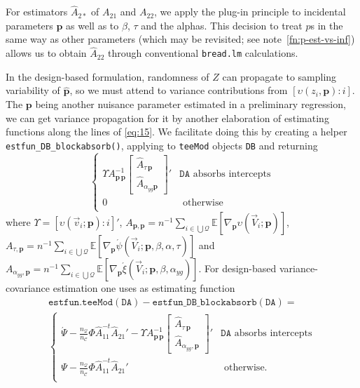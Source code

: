 \documentclass{article}
\newcommand{\absorbInterceptsEF}{\upsilon}
\newcommand{\AbsorbInterceptsEF}{\Upsilon}
\begin{document}
For estimators $\hat{A}_{2*}$ of $A_{21}$ and $A_{22}$, we apply the plug-in
principle to incidental parameters $\mathbf{p}$ as well as to $\beta$,
$\tau$ and the alphas. This decision to treat $p$s in the same way as
other parameters (which may be revisited; see note~\ref{fn:p-est-vs-inf}) allows
us to obtain $\hat{A}_{22}$ through conventional \texttt{bread.lm}
calculations. 

In the design-based formulation, randomness of $Z$ can propagate to
sampling variability of $\hat{\mathbf{p}}$,  so we must attend to
variance contributions from $[\absorbInterceptsEF(z_{i}, \mathbf{p}): i]$.
The $\mathbf{p}$ being another nuisance parameter estimated in a
preliminary regression, we can get variance propagation for it by
another elaboration of estimating functions along the lines of
\eqref{eq:15}. We facilitate doing
this by creating a
helper \texttt{estfun\_DB\_blockabsorb()}, applying to
\texttt{teeMod} objects \texttt{DB} and returning
\begin{equation*}
\begin{cases}
  \AbsorbInterceptsEF{}
  A_{\mathbf{p}\,\mathbf{p}}^{-1}
  \begin{bmatrix}\hat{A}_{\tau\,\mathbf{p}}\\ \hat{A}_{\alpha_{yg}\mathbf{p}}\end{bmatrix}' &
  \mathtt{DA} \text{ absorbs intercepts}\\
0 & \text{ otherwise}\\
\end{cases}
\end{equation*}
where
$\AbsorbInterceptsEF= [\absorbInterceptsEF(\vec{v}_{i}; \mathbf{p}): i]'$,
$A_{\mathbf{p}, \mathbf{p}} = n^{-1}\sum_{i\in \bigcup
  \mathcal{Q}}\mathbb{E} [\nabla_{\mathbf{p}}\absorbInterceptsEF(\vec{V}_{i};
\mathbf{p})]$, $A_{\tau, \mathbf{p}} = n^{-1} \sum_{i\in \bigcup
  \mathcal{Q}}\mathbb{E}[\nabla_{\mathbf{p}}\acute{\psi}(\vec{V}_{i};
\mathbf{p}, \beta, \alpha, \tau)]$ and
$A_{\alpha_{yg}, \mathbf{p}} = n^{-1} \sum_{i\in \bigcup
  \mathcal{Q}}\mathbb{E}[\nabla_{\mathbf{p}}\acute{\xi}(\vec{V}_{i};
\mathbf{p}, \beta, \alpha_{yg})]$.  For design-based variance-covariance
estimation one uses as estimating function
\begin{multline*}\label{eq:25}
  \mathtt{estfun.teeMod(DA)} -
  \mathtt{estfun\_DB\_blockabsorb(DA)} =\\
\begin{cases}
\acute{\Psi} -
  \frac{n_{\mathcal{Q}}}{n_{\mathcal{C}}}\Phi
  \hat{A}_{11}^{-t}\hat{A}_{21}'  - \AbsorbInterceptsEF{}
  A_{\mathbf{p}\,\mathbf{p}}^{-1}\begin{bmatrix}\hat{A}_{\tau\,\mathbf{p}}\\ \hat{A}_{\alpha_{yg}, \mathbf{p}}\end{bmatrix}' & \mathtt{DA} \text{ absorbs intercepts}\\
 \Psi -
  \frac{n_{\mathcal{Q}}}{n_{\mathcal{C}}}\Phi
  \hat{A}_{11}^{-t}\hat{A}_{21}'
 & \text{ otherwise}.\\
\end{cases}
\end{multline*}
\end{document}
